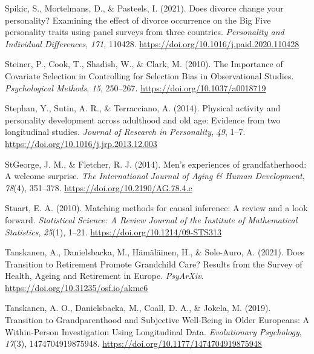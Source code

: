 \documentclass[
  english,
  man, noextraspace]{apa7}
\begin{document}
\leavevmode\hypertarget{ref-spikicDoesDivorceChange2021}{}%
Spikic, S., Mortelmans, D., \& Pasteels, I. (2021). Does divorce change your personality? Examining the effect of divorce occurrence on the Big Five personality traits using panel surveys from three countries. \emph{Personality and Individual Differences}, \emph{171}, 110428. \url{https://doi.org/10.1016/j.paid.2020.110428}

\leavevmode\hypertarget{ref-steinerImportanceCovariateSelection2010}{}%
Steiner, P., Cook, T., Shadish, W., \& Clark, M. (2010). The Importance of Covariate Selection in Controlling for Selection Bias in Observational Studies. \emph{Psychological Methods}, \emph{15}, 250--267. \url{https://doi.org/10.1037/a0018719}

\leavevmode\hypertarget{ref-stephanPhysicalActivityPersonality2014}{}%
Stephan, Y., Sutin, A. R., \& Terracciano, A. (2014). Physical activity and personality development across adulthood and old age: Evidence from two longitudinal studies. \emph{Journal of Research in Personality}, \emph{49}, 1--7. \url{https://doi.org/10.1016/j.jrp.2013.12.003}

\leavevmode\hypertarget{ref-stgeorgeMenExperiencesGrandfatherhood2014}{}%
StGeorge, J. M., \& Fletcher, R. J. (2014). Men's experiences of grandfatherhood: A welcome surprise. \emph{The International Journal of Aging \& Human Development}, \emph{78}(4), 351--378. \url{https://doi.org/10.2190/AG.78.4.c}

\leavevmode\hypertarget{ref-stuartMatchingMethodsCausal2010}{}%
Stuart, E. A. (2010). Matching methods for causal inference: A review and a look forward. \emph{Statistical Science: A Review Journal of the Institute of Mathematical Statistics}, \emph{25}(1), 1--21. \url{https://doi.org/10.1214/09-STS313}

\leavevmode\hypertarget{ref-tanskanenDoesTransitionRetirement2021}{}%
Tanskanen, A., Danielsbacka, M., Hämäläinen, H., \& Sole-Auro, A. (2021). Does Transition to Retirement Promote Grandchild Care? Results from the Survey of Health, Ageing and Retirement in Europe. \emph{PsyArXiv}. \url{https://doi.org/10.31235/osf.io/akme6}

\leavevmode\hypertarget{ref-tanskanenTransitionGrandparenthoodSubjective2019}{}%
Tanskanen, A. O., Danielsbacka, M., Coall, D. A., \& Jokela, M. (2019). Transition to Grandparenthood and Subjective Well-Being in Older Europeans: A Within-Person Investigation Using Longitudinal Data. \emph{Evolutionary Psychology}, \emph{17}(3), 1474704919875948. \url{https://doi.org/10.1177/1474704919875948}
\end{document}
